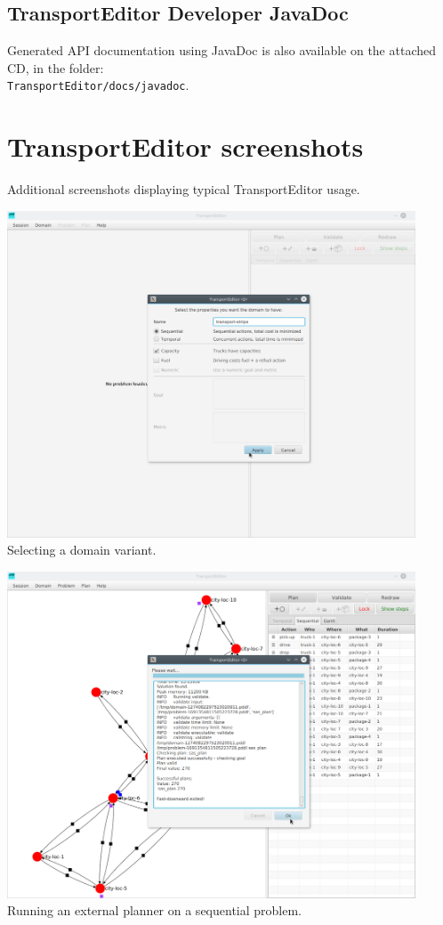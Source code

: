 \subsection*{TransportEditor Developer JavaDoc}\label{transporteditor-developer-javadoc}

Generated API documentation using JavaDoc is also available on the attached CD, in the folder:\\
\verb+TransportEditor/docs/javadoc+.

\newpage

\section*{TransportEditor screenshots}\label{transport-editor-screenshots}

Additional screenshots displaying typical TransportEditor usage.
\medskip

\begin{center}
\includegraphics[width=0.91\textwidth]{../img/transporteditor_dom-creat}
Selecting a domain variant.
\end{center}
\medskip

\begin{center}
\includegraphics[width=0.91\textwidth]{../img/transporteditor_planning}
Running an external planner on a sequential problem.
\end{center}
\medskip

